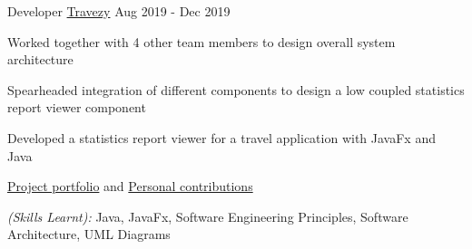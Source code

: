 \begin{cventries}
  \cventry
    {Developer} %
    {\href{https://github.com/bjhoohaha/main}{Travezy}} %
    {} %
    {Aug 2019 - Dec 2019} %
    {
      \begin{cvitems} %
        \item {Worked together with 4 other team members to design overall system architecture}
        \item {Spearheaded integration of different components to design a low coupled statistics report viewer component}
        \item {Developed a statistics report viewer for a travel application with JavaFx and Java}
        \item {\textcolor{eduDft-darkblue}{\href{https://ay1920s1-cs2103t-t17-2.github.io/main/index.html}{Project portfolio}} and  \textcolor{eduDft-darkblue}{\href{https://ay1920s1-cs2103t-t17-2.github.io/main/team/bjhoohaha.html}{Personal contributions}}}
        \item {\textit{(Skills Learnt):} Java, JavaFx, Software Engineering Principles, Software Architecture, UML Diagrams}
      \end{cvitems}
    }



\end{cventries}
